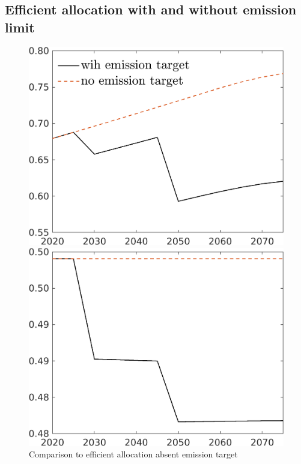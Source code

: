 \subsection{Efficient allocation with and without emission limit}\label{app:eff_notarg}
\begin{figure}[h!!]
	\centering
	\caption{Comparison to efficient allocation absent emission target }\label{fig:eff_with_notarget}
	\begin{minipage}[]{0.32\textwidth}
		\includegraphics[width=1\textwidth]{../../codding_model/own_basedOnFried/optimalPol_190722_tidiedUp/figures/all_July22/C_TargetCompSP_T_spillover0_noskill0_sep1_xgrowth0_etaa0.79_lgd1.png}
	\end{minipage}
	\begin{minipage}[]{0.32\textwidth}
	\includegraphics[width=1\textwidth]{../../codding_model/own_basedOnFried/optimalPol_190722_tidiedUp/figures/all_July22/hh_TargetCompSP_T_spillover0_noskill0_sep1_xgrowth0_etaa0.79_lgd0.png}

\end{minipage}
\end{figure}
